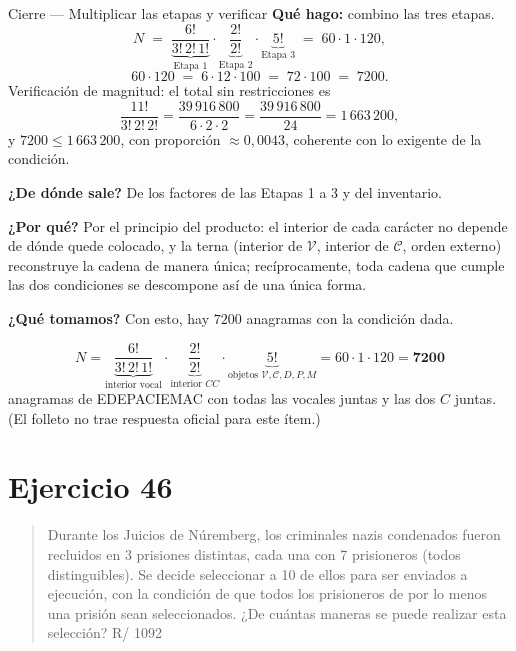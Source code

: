 \documentclass[11pt]{article}
\begin{document}
\begin{paso}{Cierre --- Multiplicar las etapas y verificar}
\textbf{Qu\'e hago:} combino las tres etapas.
\[
N\;=\;\underbrace{\frac{6!}{3!\,2!\,1!}}_{\text{Etapa 1}}\cdot\underbrace{\frac{2!}{2!}}_{\text{Etapa 2}}\cdot\underbrace{5!}_{\text{Etapa 3}}
\;=\;60\cdot 1\cdot 120 ,
\]
\[
60\cdot 120\;=\;6\cdot 12\cdot 100\;=\;72\cdot 100\;=\;7200 .
\]
Verificaci\'on de magnitud: el total sin restricciones es
\[
\frac{11!}{3!\,2!\,2!}=\frac{39\,916\,800}{6\cdot 2\cdot 2}=\frac{39\,916\,800}{24}=1\,663\,200 ,
\]
y $7200\le 1\,663\,200$, con proporci\'on $\approx 0{,}0043$, coherente con lo exigente de la condici\'on.

\textbf{¿De d\'onde sale?} De los factores de las Etapas 1 a 3 y del inventario.

\textbf{¿Por qu\'e?} Por el principio del producto: el interior de cada car\'acter no depende de d\'onde
quede colocado, y la terna (interior de $\mathcal{V}$, interior de $\mathcal{C}$, orden externo) reconstruye
la cadena de manera \'unica; rec\'iprocamente, toda cadena que cumple las dos condiciones se descompone
as\'i de una \'unica forma.

\textbf{¿Qu\'e tomamos?} Con esto, hay $7200$ anagramas con la condici\'on dada.
\end{paso}

\begin{resp}
\[
N=\underbrace{\frac{6!}{3!\,2!\,1!}}_{\text{interior vocal}}\cdot\underbrace{\frac{2!}{2!}}_{\text{interior }CC}\cdot\underbrace{5!}_{\text{objetos }\mathcal{V},\mathcal{C},D,P,M}=60\cdot 1\cdot 120=\mathbf{7200}
\]
anagramas de EDEPACIEMAC con todas las vocales juntas y las dos $C$ juntas. (El folleto no trae respuesta
oficial para este \'item.)
\end{resp}

\section*{Ejercicio 46}

\begin{quote}
Durante los Juicios de N\'uremberg, los criminales nazis condenados fueron recluidos en 3 prisiones
distintas, cada una con 7 prisioneros (todos distinguibles). Se decide seleccionar a 10 de ellos para ser
enviados a ejecuci\'on, con la condici\'on de que todos los prisioneros de por lo menos una prisi\'on sean
seleccionados. ¿De cu\'antas maneras se puede realizar esta selecci\'on? \hfill R/ 1092
\end{quote}
\end{document}
